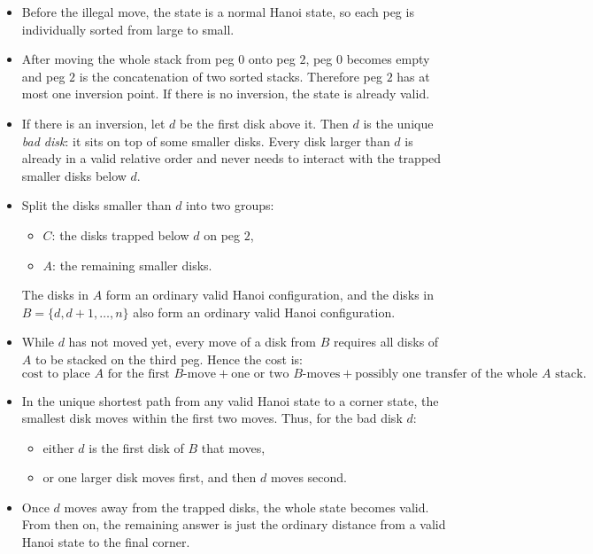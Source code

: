 \documentclass[11pt]{article}
\begin{document}
\begin{itemize}[leftmargin=*]
    \item Before the illegal move, the state is a normal Hanoi state, so each peg is individually sorted from large to small.
    \item After moving the whole stack from peg $0$ onto peg $2$, peg $0$ becomes empty and peg $2$ is the concatenation of two sorted stacks. Therefore peg $2$ has at most one inversion point. If there is no inversion, the state is already valid.
    \item If there is an inversion, let $d$ be the first disk above it. Then $d$ is the unique \emph{bad disk}: it sits on top of some smaller disks. Every disk larger than $d$ is already in a valid relative order and never needs to interact with the trapped smaller disks below $d$.
    \item Split the disks smaller than $d$ into two groups:
    \begin{itemize}[leftmargin=*]
        \item $C$: the disks trapped below $d$ on peg $2$,
        \item $A$: the remaining smaller disks.
    \end{itemize}
    The disks in $A$ form an ordinary valid Hanoi configuration, and the disks in $B=\{d,d+1,\dots,n\}$ also form an ordinary valid Hanoi configuration.
    \item While $d$ has not moved yet, every move of a disk from $B$ requires all disks of $A$ to be stacked on the third peg. Hence the cost is:
    \[
        \text{cost to place }A\text{ for the first }B\text{-move}
        + \text{one or two }B\text{-moves}
        + \text{possibly one transfer of the whole }A\text{ stack.}
    \]
    \item In the unique shortest path from any valid Hanoi state to a corner state, the smallest disk moves within the first two moves. Thus, for the bad disk $d$:
    \begin{itemize}[leftmargin=*]
        \item either $d$ is the first disk of $B$ that moves,
        \item or one larger disk moves first, and then $d$ moves second.
    \end{itemize}
    \item Once $d$ moves away from the trapped disks, the whole state becomes valid. From then on, the remaining answer is just the ordinary distance from a valid Hanoi state to the final corner.
\end{itemize}
\end{document}
